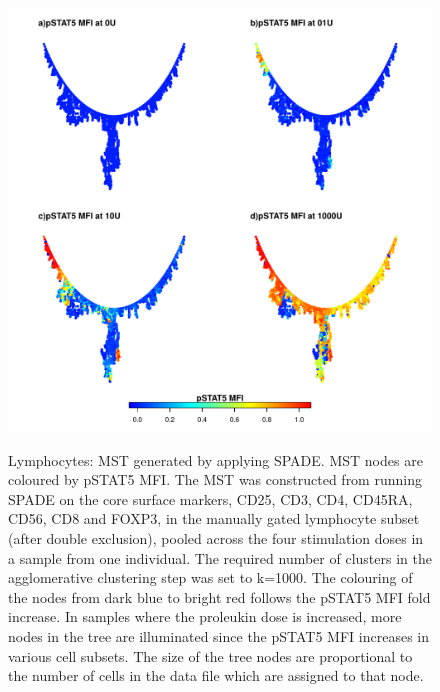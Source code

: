 \begin{figure}[h!]
\centering
\begin{minipage}{.7\textwidth}
\includegraphics[width=\linewidth]{figures/spade-lymphocytes-pstat5mfi}
\end{minipage}
{Lymphocytes: \gls{MST} generated by applying \gls{SPADE}.}
{
  \gls{MST} nodes are coloured by pSTAT5 \gls{MFI}.
  The \gls{MST} was constructed from running \gls{SPADE} on the core surface markers,
  CD25, CD3, CD4, CD45RA, CD56, CD8 and FOXP3, in the manually gated lymphocyte subset (after double exclusion),
  pooled across the four stimulation doses in a sample from one individual.
  The required number of clusters in the agglomerative clustering step was set to k=1000.
  The colouring of the nodes from dark blue to bright red follows the pSTAT5 MFI fold increase.
  In samples where the proleukin dose is increased, more nodes in the tree are illuminated since the pSTAT5 MFI increases in various cell subsets.
  The size of the tree nodes are proportional to the number of cells in the data file which are assigned to that node.
}
\end{figure}

